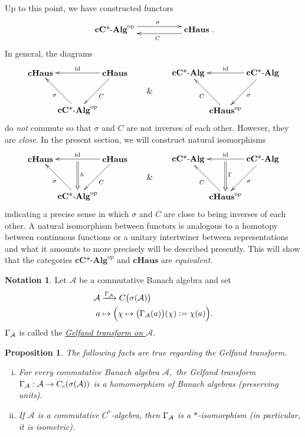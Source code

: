\documentclass[12pt]{article}
\edef\t{\pgfmathresult}%
\theoremstyle{theorem}
\newtheorem{proposition}[equation]{Proposition}
\theoremstyle{definition}
\newtheorem{notation}[equation]{Notation}
\numberwithin{equation}{section}
\let\s=\sigma \let\t=\tau \let\u=\upsilon \let\f=\phi \let\c=\chi
\newcommand{\be}{\begin{equation}}
\newcommand{\ee}{\end{equation}}
\newcommand{\bn}{\begin{proposition}}
\newcommand{\en}{\end{proposition}}
\newcommand{\<}{\langle}
\renewcommand{\>}{\rangle}
\newcommand{\id}{\mathrm{id}}
\newcommand{\aand}{\qquad \& \qquad}
\newcommand{\cCAlg}{\mathbf{cC\text{*-}Alg}}
\def\mA{{{\mathcal{A}}}}
\newcommand{\op}{\mathrm{op}}
\newcommand{\cH}{\mathbf{cHaus}}
\begin{document}
Up to this point, we have constructed functors 
\be
\xymatrix{
\cCAlg^{\op}
\ar@<1.0ex>[rr]^(0.525){\s} 
& & \ar@<1.0ex>[ll]^(0.475){C} \cH
}
.
\ee
In general, the diagrams 
\be
\xy0;/r.25pc/:
(-15,7.5)*+{\cH}="3";
(15,7.5)*+{\cH}="1";
(0,-7.5)*+{\cCAlg^{\op}}="2";
{\ar"1";"2"^{C}};
{\ar"2";"3"^{\s}};
{\ar"1";"3"_{\id}};
\endxy
\aand
\xy0;/r.25pc/:
(-15,7.5)*+{\cCAlg}="3";
(15,7.5)*+{\cCAlg}="1";
(0,-7.5)*+{\cH^{\op}}="2";
{\ar"1";"2"^{\s}};
{\ar"2";"3"^{C}};
{\ar"1";"3"_{\id}};
\endxy
\ee
do \emph{not} commute so that $\s$ and $C$ are not inverses
of each other. However, they are \emph{close}.
In the present section, we will construct natural  
isomorphisms
\be
\xy0;/r.25pc/:
(-15,7.5)*+{\cH}="3";
(15,7.5)*+{\cH}="1";
(0,-7.5)*+{\cCAlg^{\op}}="2";
{\ar"1";"2"^{C}};
{\ar"2";"3"^{\s}};
{\ar"1";"3"_{\id}};
{\ar@{=>}(0,6.5);"2"^(0.37){h}};
\endxy
\aand
\xy0;/r.25pc/:
(-15,7.5)*+{\cCAlg}="3";
(15,7.5)*+{\cCAlg}="1";
(0,-7.5)*+{\cH^{\op}}="2";
{\ar"1";"2"^{\s}};
{\ar"2";"3"^{C}};
{\ar"1";"3"_{\id}};
{\ar@{=>}(0,6.5);"2"^(0.37){\G}};
\endxy
\ee
indicating a precise sense in which $\s$ and $C$ are close to being inverses
of each other. 
A natural isomorphism between functors is analogous to a homotopy
between continuous functions or a unitary intertwiner between representations 
and what it amounts to more precisely will
be described presently. This will show that the categories 
$\cCAlg^{\op}$ and $\cH$ are \emph{equivalent}.

\begin{notation}
\label{def:Gelfand}
Let $\mathcal{A}$ be a 
commutative Banach algebra and set 
\be
\label{eq:Gelfandtransform}
\begin{split}
\mathcal{A}&\xrightarrow{\G_{\mathcal{A}}} C\big(\s(\mathcal{A})\big) \\
a &\mapsto\Big(\chi\mapsto\big(\G_{\mathcal{A}}(a)\big)(\chi)
:=\chi(a)\Big).
\end{split}
\ee
$\Gamma_{\mathcal{A}}$ is called the 
\emph{\uline{Gelfand transform on $\mathcal{A}$}}.
\end{notation}

\bn
\label{prop:Gelfandfacts}
The following facts are true regarding the Gelfand transform.
\begin{enumerate}[i.]
\setlength{\itemsep}{0pt}
\item
For every commutative 
Banach algebra $\mA,$
the Gelfand transform $\G_{\mA}:\mA\to C_{c}(\s(\mA))$
is a 
homomorphism of Banach algebras (preserving units).
\item
If $\mA$ is a commutative $C^*$-algebra,
then $\G_{\mA}$ is a $*$-isomorphism (in particular, it is isometric).
\end{enumerate}
\en
\end{document}
